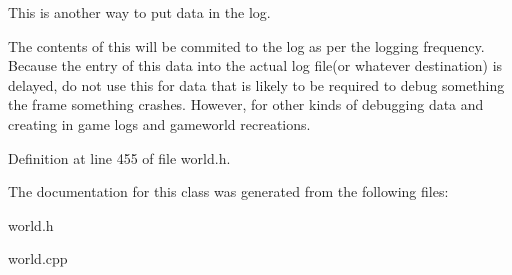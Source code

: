 This is another way to put data in the log. 

The contents of this will be commited to the log as per the logging frequency. Because the entry of this data into the actual log file(or whatever destination) is delayed, do not use this for data that is likely to be required to debug something the frame something crashes. However, for other kinds of debugging data and creating in game logs and gameworld recreations. 

Definition at line 455 of file world.h.



The documentation for this class was generated from the following files:\begin{DoxyCompactItemize}
\item 
world.h\item 
world.cpp\end{DoxyCompactItemize}
